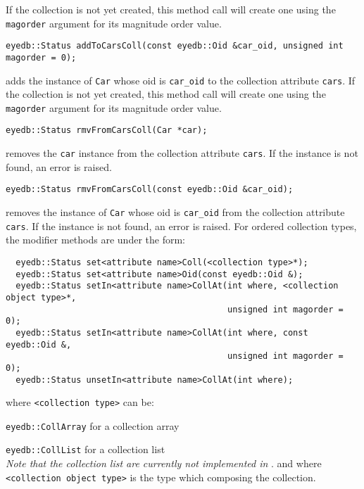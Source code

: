 If the collection is not yet created, this method call will create one
using the \texttt{magorder} argument for its magnitude order value.
\item
\verbsize
\begin{verbatim}
eyedb::Status addToCarsColl(const eyedb::Oid &car_oid, unsigned int magorder = 0);
\end{verbatim}
\normalsize
adds the instance of \texttt{Car} whose oid is \texttt{car\_oid}
to the collection attribute \texttt{cars}.
If the collection is not yet created, this method call will create one
using the \texttt{magorder} argument for its magnitude order value.
\item
\verbsize
\begin{verbatim}
eyedb::Status rmvFromCarsColl(Car *car);
\end{verbatim}
\normalsize
removes the \texttt{car} instance from the collection attribute \texttt{cars}.
If the instance is not found, an error is raised.
\item
\verbsize
\begin{verbatim}
eyedb::Status rmvFromCarsColl(const eyedb::Oid &car_oid);
\end{verbatim}
\normalsize
removes the instance of \texttt{Car} whose oid is \texttt{car\_oid}
from the collection attribute \texttt{cars}.
If the instance is not found, an error is raised.
\ee
For ordered collection types, the modifier methods are under the form:
\verbsize
\begin{verbatim}
  eyedb::Status set<attribute name>Coll(<collection type>*);
  eyedb::Status set<attribute name>Oid(const eyedb::Oid &);
  eyedb::Status setIn<attribute name>CollAt(int where, <collection object type>*,
                                            unsigned int magorder = 0);
  eyedb::Status setIn<attribute name>CollAt(int where, const eyedb::Oid &,
                                            unsigned int magorder = 0);
  eyedb::Status unsetIn<attribute name>CollAt(int where);
\end{verbatim}
\normalsize
where \texttt{<collection type>} can be:
\be
\item \texttt{eyedb::CollArray} for a collection array
\item \texttt{eyedb::CollList} for a collection list\\
\emph{Note that the collection list are currently not implemented in
\eyedb}.
\ee
and where \texttt{<collection object type>} is the type which composing
the collection.
\\
\\
